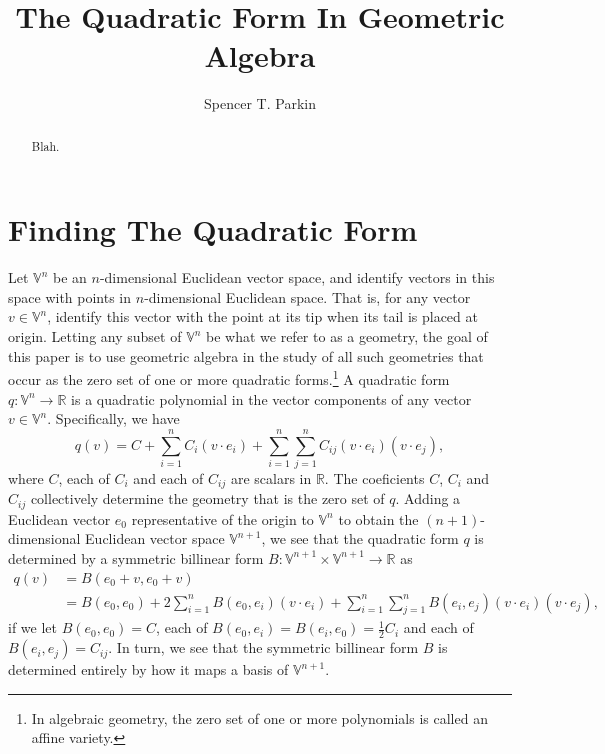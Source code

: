 \documentclass{birkjour}
\theoremstyle{definition}
\theoremstyle{remark}
\numberwithin{equation}{section}
\newcommand{\V}{\mathbb{V}}
\newcommand{\R}{\mathbb{R}}
\begin{document}
\title{The Quadratic Form In Geometric Algebra}

\author{Spencer T. Parkin}





\begin{abstract}
Blah.
\end{abstract}

\maketitle

\section{Finding The Quadratic Form}

Let $\V^n$ be an $n$-dimensional Euclidean vector space, and identify vectors
in this space with points in $n$-dimensional Euclidean space.  That is,
for any vector $v\in\V^n$, identify this vector with the point at its tip when
its tail is placed at origin.  Letting any subset of $\V^n$ be what we refer to
as a geometry, the goal of this paper is to use geometric algebra in the study of all
such geometries that occur as the zero set of one or more quadratic forms.\footnote{In
algebraic geometry, the zero set of one or more polynomials is called an affine variety.}
A quadratic form $q:\V^n\to\R$ is a quadratic polynomial in the vector components of any
vector $v\in\V^n$.  Specifically, we have
\begin{equation}\label{equ_quadratic_form}
q(v) = C + \sum_{i=1}^n C_i(v\cdot e_i) + \sum_{i=1}^n\sum_{j=1}^n C_{ij}(v\cdot e_i)(v\cdot e_j),
\end{equation}
where $C$, each of $C_i$ and each of $C_{ij}$ are scalars in $\R$.  The coeficients $C$, $C_i$ and $C_{ij}$ collectively determine the geometry that is the zero set of $q$.  Adding a Euclidean vector $e_0$
representative of the origin to $\V^n$ to obtain the $(n+1)$-dimensional Euclidean
vector space $\V^{n+1}$, we see that the quadratic form $q$ is determined by a
symmetric billinear form $B:\V^{n+1}\times\V^{n+1}\to\R$ as
\begin{align}
q(v) &= B(e_0+v,e_0+v) \\
 &= B(e_0,e_0)+2\sum_{i=1}^n B(e_0,e_i)(v\cdot e_i)
 + \sum_{i=1}^n\sum_{j=1}^n B(e_i,e_j)(v\cdot e_i)(v\cdot e_j),
\end{align}
if we let $B(e_0,e_0)=C$, each of $B(e_0,e_i)=B(e_i,e_0)=\frac{1}{2}C_i$ and each of
$B(e_i,e_j)=C_{ij}$.
In turn, we see that the symmetric billinear form $B$ is determined entirely by how it
maps a basis of $\V^{n+1}$.
\end{document}

